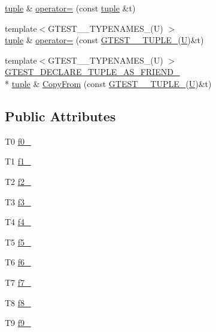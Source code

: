 \begin{DoxyCompactItemize}
\item 
\hyperlink{classstd_1_1tr1_1_1tuple}{tuple} \& \hyperlink{classstd_1_1tr1_1_1tuple_a2544141b07a65060937e594228ee815a}{operator=} (const \hyperlink{classstd_1_1tr1_1_1tuple}{tuple} \&t)
\item 
{\footnotesize template$<$G\-T\-E\-S\-T\-\_\-\_\-\-T\-Y\-P\-E\-N\-A\-M\-E\-S\-\_\-(\-U) $>$ }\\\hyperlink{classstd_1_1tr1_1_1tuple}{tuple} \& \hyperlink{classstd_1_1tr1_1_1tuple_af0df06ea0529f3caa6cbbf9daaa4d341}{operator=} (const \hyperlink{namespacestd_1_1tr1_aa636d3269bf1f368a7bc09ff158bc482}{G\-T\-E\-S\-T\-\_\-\_\-\-T\-U\-P\-L\-E\-\_\-}(\hyperlink{core__c_8h_aa9c521f41af9a5191e5e4b6ffbae211a}{U})\&t)
\item 
{\footnotesize template$<$G\-T\-E\-S\-T\-\_\-\_\-\-T\-Y\-P\-E\-N\-A\-M\-E\-S\-\_\-(\-U) $>$ }\\\hyperlink{ts__gtest_8h_a2b20671273f514a88a6e9b8328e5f257}{G\-T\-E\-S\-T\-\_\-\-D\-E\-C\-L\-A\-R\-E\-\_\-\-T\-U\-P\-L\-E\-\_\-\-A\-S\-\_\-\-F\-R\-I\-E\-N\-D\-\_\-} \\*
\hyperlink{classstd_1_1tr1_1_1tuple}{tuple} \& \hyperlink{classstd_1_1tr1_1_1tuple_aa76d0c02e6f4c6c99f32f9738623f23c}{Copy\-From} (const \hyperlink{namespacestd_1_1tr1_aa636d3269bf1f368a7bc09ff158bc482}{G\-T\-E\-S\-T\-\_\-\_\-\-T\-U\-P\-L\-E\-\_\-}(\hyperlink{core__c_8h_aa9c521f41af9a5191e5e4b6ffbae211a}{U})\&t)
\end{DoxyCompactItemize}
\subsection*{Public Attributes}
\begin{DoxyCompactItemize}
\item 
T0 \hyperlink{classstd_1_1tr1_1_1tuple_a133b02f631ce9c46c8368756d5ce7d68}{f0\-\_\-}
\item 
T1 \hyperlink{classstd_1_1tr1_1_1tuple_a809d974a332969e624830b02d9361107}{f1\-\_\-}
\item 
T2 \hyperlink{classstd_1_1tr1_1_1tuple_a1a3d444570fccf3810322a5cea025993}{f2\-\_\-}
\item 
T3 \hyperlink{classstd_1_1tr1_1_1tuple_a7d1ea537cc17e4c1aa1e4a7b39822c93}{f3\-\_\-}
\item 
T4 \hyperlink{classstd_1_1tr1_1_1tuple_a893ccbbb34a262058b4cfa5020bbf84e}{f4\-\_\-}
\item 
T5 \hyperlink{classstd_1_1tr1_1_1tuple_a1fbe806ede11f6e48aff17ce5c7b96a8}{f5\-\_\-}
\item 
T6 \hyperlink{classstd_1_1tr1_1_1tuple_a1b7ddbc9893546b3028ee8f4543534cc}{f6\-\_\-}
\item 
T7 \hyperlink{classstd_1_1tr1_1_1tuple_a254d543fc3669d5cbd41d5da833b9492}{f7\-\_\-}
\item 
T8 \hyperlink{classstd_1_1tr1_1_1tuple_a335bd9d920b8aff1e2a47980bbf274db}{f8\-\_\-}
\item 
T9 \hyperlink{classstd_1_1tr1_1_1tuple_a1b8a389f9e3974be4130f6ba2fbe5234}{f9\-\_\-}
\end{DoxyCompactItemize}
